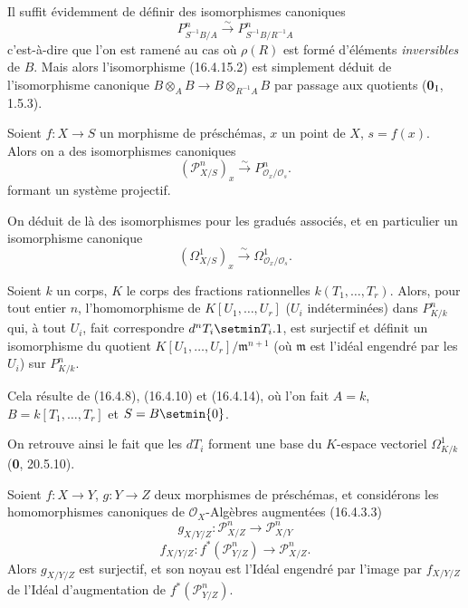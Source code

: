 Il suffit évidemment de définir des isomorphismes canoniques
\[
  P_{S^{-1}B/A}^n\xrightarrow{\sim}P_{S^{-1}B/R^{-1}A}^n
  \tag{16.4.15.2}
  \label{IV.16.4.15.2}
\]
c'est-à-dire que l'on est ramené au cas où $\rho(R)$ est formé d'éléments
\emph{inversibles} de $B$. Mais alors l'isomorphisme (16.4.15.2) est simplement
déduit de l'isomorphisme canonique
$B\otimes_A B\to B\otimes_{R^{-1}A}B$ par passage aux quotients
(\textbf{0}$_{\rm I}$, 1.5.3).

\begin{corollary}[16.4.16]
\label{IV.16.4.16}
Soient $f:X\to S$ un morphisme de préschémas, $x$ un point de $X$,
$s=f(x)$. Alors on a des isomorphismes canoniques
\[
  (\mathscr{P}_{X/S}^n)_x\xrightarrow{\sim}
  P_{\mathcal{O}_x/\mathcal{O}_s}^n.
  \tag{16.4.16.1}
  \label{IV.16.4.16.1}
\]
formant un système projectif.
\end{corollary}

On déduit de là des isomorphismes pour les gradués associés, et en particulier
un isomorphisme canonique
\[
  (\varOmega_{X/S}^1)_x\xrightarrow{\sim}
  \Omega_{\mathcal{O}_x/\mathcal{O}_s}^1.
  \tag{16.4.16.2}
  \label{IV.16.4.16.2}
\]

\begin{corollary}[16.4.17]
\label{IV.16.4.17}
Soient $k$ un corps, $K$ le corps des fractions rationnelles
$k(T_1,\ldots,T_r)$. Alors, pour tout entier $n$, l'homomorphisme de
$K[U_1,\ldots,U_r]$ ($U_i$ indéterminées) dans $P_{K/k}^n$ qui, à tout $U_i$,
fait correspondre $d^nT_i\setmin T_i.1$, est surjectif et définit un isomorphisme
du quotient $K[U_1,\ldots,U_r]/\mathfrak{m}^{n+1}$ (où $\mathfrak{m}$ est
l'idéal engendré par les $U_i$) sur $P_{K/k}^n$.
\end{corollary}

Cela résulte de (16.4.8), (16.4.10) et (16.4.14), où l'on fait $A=k$,
$B=k[T_1,\ldots,T_r]$ et $S=B\setmin\{0\}$.

On retrouve ainsi le fait que les $dT_i$ forment une base du $K$-espace
vectoriel $\Omega_{K/k}^1$ (\textbf{0}, 20.5.10).

\begin{proposition}[16.4.18]
\label{IV.16.4.18}
Soient $f:X\to Y$, $g:Y\to Z$ deux morphismes de préschémas, et considérons
les homomorphismes canoniques de $\mathcal{O}_X$-Algèbres augmentées
\textup{(16.4.3.3)}
\[
  g_{X/Y/Z}:\mathscr{P}_{X/Z}^n\longrightarrow\mathscr{P}_{X/Y}^n
  \tag{16.4.18.1}
  \label{IV.16.4.18.1}
\]
\[
  f_{X/Y/Z}:f^*(\mathscr{P}_{Y/Z}^n)
  \longrightarrow\mathscr{P}_{X/Z}^n.
  \tag{16.4.18.2}
  \label{IV.16.4.18.2}
\]
Alors $g_{X/Y/Z}$ est surjectif, et son noyau est l'Idéal engendré par l'image
par $f_{X/Y/Z}$ de l'Idéal d'augmentation de
$f^*(\mathscr{P}_{Y/Z}^n)$.
\end{proposition}

